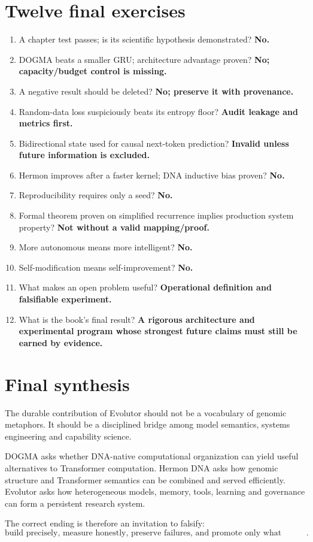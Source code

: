 \section{Twelve final exercises}
\begin{enumerate}
\item A chapter test passes; is its scientific hypothesis demonstrated? \textbf{No.}
\item DOGMA beats a smaller GRU; architecture advantage proven? \textbf{No; capacity/budget control is missing.}
\item A negative result should be deleted? \textbf{No; preserve it with provenance.}
\item Random-data loss suspiciously beats its entropy floor? \textbf{Audit leakage and metrics first.}
\item Bidirectional state used for causal next-token prediction? \textbf{Invalid unless future information is excluded.}
\item Hermon improves after a faster kernel; DNA inductive bias proven? \textbf{No.}
\item Reproducibility requires only a seed? \textbf{No.}
\item Formal theorem proven on simplified recurrence implies production system property? \textbf{Not without a valid mapping/proof.}
\item More autonomous means more intelligent? \textbf{No.}
\item Self-modification means self-improvement? \textbf{No.}
\item What makes an open problem useful? \textbf{Operational definition and falsifiable experiment.}
\item What is the book's final result? \textbf{A rigorous architecture and experimental program whose strongest future claims must still be earned by evidence.}
\end{enumerate}

\section{Final synthesis}
The durable contribution of Evolutor should not be a vocabulary of genomic metaphors. It should be a disciplined bridge among model semantics, systems engineering and capability science.

DOGMA asks whether DNA-native computational organization can yield useful alternatives to Transformer computation. Hermon DNA asks how genomic structure and Transformer semantics can be combined and served efficiently. Evolutor asks how heterogeneous models, memory, tools, learning and governance can form a persistent research system.

The correct ending is therefore an invitation to falsify:
\[
\boxed{\text{build precisely, measure honestly, preserve failures, and promote only what evidence supports}.}
\]

